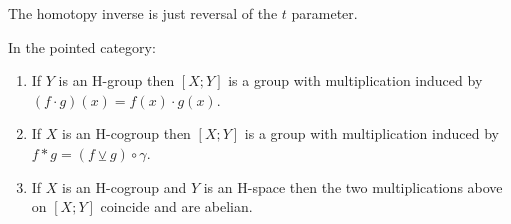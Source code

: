 The homotopy inverse is just reversal of the $t$ parameter.


\begin{theorem}[]\label{Thm:H-group-cogroup}
    In the pointed category:
    \begin{enumerate}
        \item If $Y$ is an H-group then
            $\left[ X ; Y \right] $ is a group with
            multiplication induced by
            $\left( f\cdot g \right) (x) = f(x) \cdot g(x)$.
        \item If $X$ is an H-cogroup then
            $\left[ X;Y \right] $ is a group with multiplication
            induced by $f * g = \left( f \veebar g \right) \circ
            \gamma$.
        \item If $X$ is an  H-cogroup and $Y$ is an
            H-space then the two multiplications above
            on $\left[ X;Y \right] $ coincide and are abelian.
    \end{enumerate}
\end{theorem}

